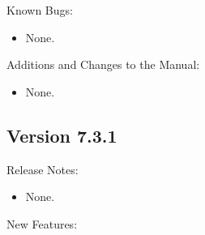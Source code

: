 \noindent Known Bugs:

\begin{itemize}

\item None.

\end{itemize}

\noindent Additions and Changes to the Manual:

\begin{itemize}

\item None.

\end{itemize}


\subsection*{\label{sec:New-7-3-1}Version 7.3.1}

\noindent Release Notes:

\begin{itemize}

\item None.

\end{itemize}


\noindent New Features:

